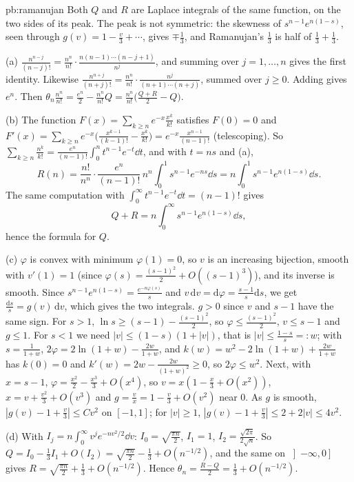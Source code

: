 \begin{solution}{pb:ramanujan}
\idea Both $Q$ and $R$ are Laplace integrals of the same function, on the two sides of its peak. The peak is not symmetric: the skewness of $s^{n-1}e^{n(1-s)}$, seen through
$g(v)=1-\frac v3+\cdots$, gives $\mp\frac13$, and Ramanujan's $\frac13$ is half of $\frac13+\frac13$.

\writeup (a) $\frac{n^{n-j}}{(n-j)!}=\frac{n^n}{n!}\cdot\frac{n(n-1)\cdots(n-j+1)}{n^j}$, and summing over $j=1,\dots,n$ gives the first identity. Likewise $\frac{n^{n+j}}{(n+j)!}=\frac{n^n}{n!}\cdot\frac{n^j}{(n+1)\cdots(n+j)}$, summed
over $j\ge0$. Adding gives $e^n$. Then $\theta_n\frac{n^n}{n!}=\frac{e^n}2-\frac{n^n}{n!}Q=\frac{n^n}{n!}\bigl(\frac{Q+R}2-Q\bigr)$.

(b) The function $F(x)=\sum_{k\ge n}e^{-x}\frac{x^k}{k!}$ satisfies $F(0)=0$ and $F'(x)=\sum_{k\ge n}e^{-x}\bigl(\frac{x^{k-1}}{(k-1)!}-\frac{x^k}{k!}\bigr)=e^{-x}\frac{x^{n-1}}{(n-1)!}$ (telescoping). So
$\sum_{k\ge n}\frac{n^k}{k!}=\frac{e^n}{(n-1)!}\int_0^nt^{n-1}e^{-t}\dd t$, and with $t=ns$ and (a),
\[
R(n)=\frac{n!}{n^n}\cdot\frac{e^n}{(n-1)!}\,n^n\int_0^1s^{n-1}e^{-ns}\dd s=n\int_0^1s^{n-1}e^{n(1-s)}\dd s.
\]
The same computation with $\int_0^\infty t^{n-1}e^{-t}\dd t=(n-1)!$ gives
\[
Q+R=n\int_0^\infty s^{n-1}e^{n(1-s)}\dd s,
\]
hence the formula for $Q$.

(c) $\varphi$ is convex with minimum $\varphi(1)=0$, so $v$ is an increasing bijection, smooth with $v'(1)=1$ (since $\varphi(s)=\frac{(s-1)^2}2+O((s-1)^3)$), and its inverse is smooth. Since
$s^{n-1}e^{n(1-s)}=\frac{e^{-n\varphi(s)}}s$ and $v\,\mathrm dv=\mathrm d\varphi=\frac{s-1}s\mathrm ds$, we get $\frac{\mathrm ds}s=g(v)\,\mathrm dv$, which gives the two integrals. $g>0$ since $v$ and $s-1$ have the same sign.
For $s>1$, $\ln s\ge(s-1)-\frac{(s-1)^2}2$, so $\varphi\le\frac{(s-1)^2}2$, $v\le s-1$ and $g\le1$. For $s<1$ we need $|v|\le(1-s)(1+|v|)$, that is $|v|\le\frac{1-s}s=:w$; with $s=\frac1{1+w}$,
$2\varphi=2\ln(1+w)-\frac{2w}{1+w}$, and $k(w)=w^2-2\ln(1+w)+\frac{2w}{1+w}$ has $k(0)=0$ and $k'(w)=2w-\frac{2w}{(1+w)^2}\ge0$, so $2\varphi\le w^2$. Next, with $x=s-1$, $\varphi=\frac{x^2}2-\frac{x^3}3+O(x^4)$,
so $v=x(1-\frac x3+O(x^2))$, $x=v+\frac{v^2}3+O(v^3)$ and $g=\frac vx=1-\frac v3+O(v^2)$ near $0$. As $g$ is smooth, $|g(v)-1+\frac v3|\le Cv^2$ on $[-1,1]$; for $|v|\ge1$,
$|g(v)-1+\frac v3|\le2+2|v|\le4v^2$.

(d) With $I_j=n\int_0^\infty v^je^{-nv^2/2}\dd v$: $I_0=\sqrt{\frac{\pi n}2}$, $I_1=1$, $I_2=\frac{\sqrt{2\pi}}{2\sqrt n}$. So $Q=I_0-\frac13I_1+O(I_2)=\sqrt{\frac{\pi n}2}-\frac13+O(n^{-1/2})$, and the same on
$\left]-\infty,0\right]$ gives $R=\sqrt{\frac{\pi n}2}+\frac13+O(n^{-1/2})$. Hence $\theta_n=\frac{R-Q}2=\frac13+O(n^{-1/2})$.


\end{solution}
